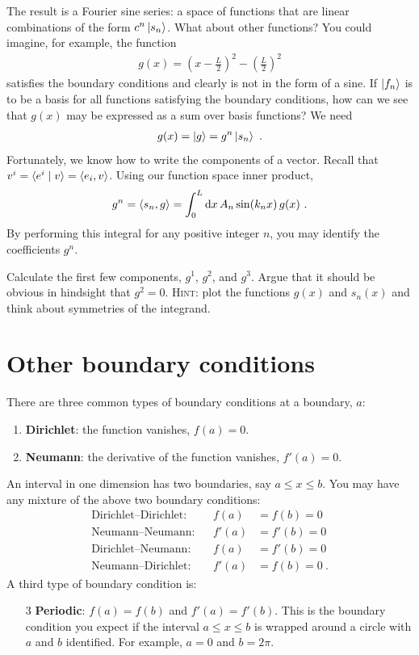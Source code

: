 The result is a Fourier sine series: a space of functions that are linear combinations of the form $c^n\left|s_n\right\rangle$.  What about other functions? You could imagine, for example, the function 
\begin{align}
    g(x) = \left(x-\frac{L}{2}\right)^2 - \left(\frac{L}{2}\right)^2
\end{align}
satisfies the boundary conditions and clearly is not in the form of a sine. If $\left|f_n\right\rangle$ is to be a basis for all functions satisfying the boundary conditions, how can we see that $g(x)$ may be expressed as a sum over basis functions? We need
\begin{align}
    g(x) = \left|g\right\rangle = g^n\left|s_n\right\rangle \ .
\end{align}
Fortunately, we know how to write the components of a vector. Recall that $v^i = \langle e^i \mid v \rangle = \langle e_i, v \rangle$. Using our function space inner product,
\begin{align}
    g^n = \langle s_n, g \rangle 
    = \int_0^L \operatorname{d}\mkern-3mu^{}\mkern-1mu{x}\, A_n \sin(k_n x) \, g(x)  \ .
\end{align}
By performing this integral for any positive integer $n$, you may identify the coefficients $g^n$.
\begin{exercise}
Calculate the first few components, $g^1$, $g^2$, and $g^3$. Argue that it should be obvious in hindsight that $g^2 = 0$. \textsc{Hint:} plot the functions $g(x)$ and $s_n(x)$ and think about symmetries of the integrand.
\end{exercise}




\section{Other boundary conditions}

There are three common types of boundary conditions at a boundary, $a$:
\begin{enumerate}
    \item \textbf{Dirichlet}: the function vanishes, $f(a)=0$.
    \item \textbf{Neumann}: the derivative of the function vanishes, $f'(a)=0$. 
\end{enumerate}
An interval in one dimension has two boundaries, say $a \leq x \leq b$. You may have any mixture of the above two boundary conditions:
\begin{align}
    \text{Dirichlet--Dirichlet:}
    &&
    f(a)&=f(b)=0
    \\
    \text{Neumann--Neumann:}
    &&
    f'(a)&=f'(b)=0
    \\
    \text{Dirichlet--Neumann:}
    &&
    f(a)&=f'(b)=0
    \\
    \text{Neumann--Dirichlet:}
    &&
    f'(a)&=f(b)=0
    \ .
\end{align}
A third type of boundary condition is:
\begin{enumerate}
    \item[3] \textbf{Periodic}: $f(a)=f(b)$ and $f'(a)=f'(b)$. This is the boundary condition you expect if the interval $a\leq x \leq b$ is wrapped around a circle with $a$ and $b$ identified. For example, $a=0$ and $b=2 \pi$. 
\end{enumerate}



